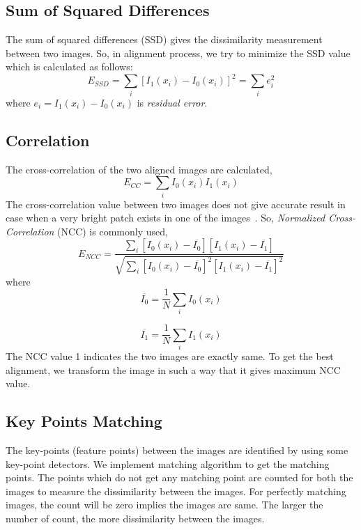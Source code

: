 \subsection*{Sum of Squared Differences}
The sum of squared differences (SSD) gives the dissimilarity measurement between two images. So, in alignment process, we try to minimize the SSD value which is calculated as follows:
\begin{equation}
E_{SSD}=\sum_{i}{[I_1(x_i)-I_0(x_i)]^2}=\sum_{i}{e_i^2}
\label{eq:ssd}
\end{equation}
where $e_i=I_1(x_i)-I_0(x_i)$ is \emph{residual error}.

\subsection*{Correlation}
The cross-correlation of the two aligned images are calculated,
\begin{equation}
E_{CC}=\sum_{i}{I_0(x_i)I_1(x_i)}
\label{eq:cross-cor}
\end{equation}
The cross-correlation value between two images does not give accurate result in case when a very bright patch exists in one of the images~\cite{Szeliski:06}. So, \emph{Normalized Cross-Correlation} (NCC) is commonly used,
\begin{equation}
E_{NCC}=\frac{\sum_{i}{[I_0(x_i)-\overline{I_0}] [I_1(x_i)-\overline{I_1}]}}{\sqrt{\sum_{i}{[I_0(x_i)-\overline{I_0}]^2[I_1(x_i)-\overline{I_1}]^2}}}
\label{eq:}
\end{equation}
where 
\begin{equation}
\overline{I_0}=\frac{1}{N}\sum_{i}{I_0(x_i)}  
\label{eq:}
\end{equation}

\begin{equation}
\overline{I_1}=\frac{1}{N}\sum_{i}{I_1(x_i)}
\label{eq:}
\end{equation}
The NCC value 1 indicates the two images are exactly same. To get the best alignment, we transform the image in such a way that it gives maximum NCC value.

\subsection*{Key Points Matching}
The key-points (feature points) between the images are identified by using some key-point detectors. We implement matching algorithm to get the matching points. The points which do not get any matching point are counted for both the images to measure the dissimilarity between the images. For perfectly matching images, the count will be zero implies the images are same. The larger the number of count, the more dissimilarity between the images.

